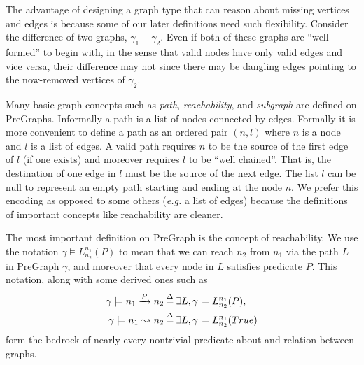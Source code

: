 The advantage of designing a graph type that can reason about missing vertices and edges is because some of our later definitions need such flexibility.  Consider the difference of two graphs, $\gamma_1 - \gamma_2$.  Even if both of these graphs are ``well-formed'' to begin with, in the sense that valid nodes have only valid edges and vice versa, their difference may not since there may be dangling edges pointing to the now-removed vertices of $\gamma_2$.

Many basic graph concepts such as \emph{path}, \emph{reachability}, and \emph{subgraph} are defined on PreGraphs.
Informally a path is a list of nodes connected by edges.  Formally it is more convenient to
define a path as an ordered pair $(n,l)$ where $n$ is a node and $l$ is a list of edges.
A valid path requires $n$ to be the source of the first edge of $l$ (if one exists) and moreover
requires $l$ to be ``well chained''.  That is, the destination of one edge in $l$ must be the 
source of the next edge.  The list $l$ can be null to represent an empty path starting and ending
at the node $n$.  We prefer this encoding as opposed to some others (\emph{e.g.} a list of edges)
because the definitions of important concepts like reachability are cleaner.

The most important definition on PreGraph is the concept of reachability.
We use the notation $\gamma \models L_{n_2}^{n_1}(P)$ to mean that we can reach $n_2$ from $n_1$ via the path $L$ in PreGraph $\gamma$, and moreover that every node in $L$ satisfies predicate $P$.  This notation, along
with some derived ones such as
\begin{equation*}
\begin{split}
\gamma\models n_1 \xrightarrow{P} n_2 &\mathbin{\stackrel{\Delta}{=}} \exists L, \gamma \models L_{n_2}^{n_1}(P),\\
\gamma\models n_1 \leadsto n_2 &\mathbin{\stackrel{\Delta}{=}} \exists L, \gamma \models L_{n_2}^{n_1}(True)
\end{split}
\end{equation*}
form the bedrock of nearly every nontrivial predicate about and relation between
graphs.

